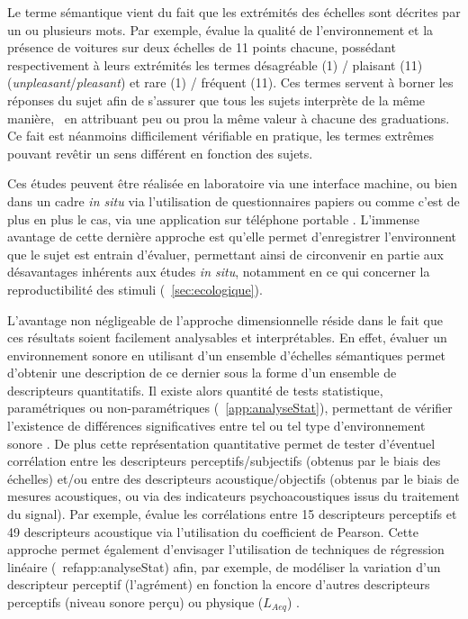 Le terme sémantique vient du fait que les extrémités des échelles sont décrites par un ou plusieurs mots. Par exemple, \citep{ricciardi2015sound} évalue la qualité de l'environnement et la présence de voitures sur deux échelles de 11 points chacune, possédant respectivement à leurs extrémités les termes désagréable (1) / plaisant (11) (\emph{unpleasant}/\emph{pleasant}) et rare (1) / fréquent (11). Ces termes servent à borner les réponses du sujet afin de s'assurer que tous les sujets interprète de la même manière, \ie~en attribuant  peu ou prou la même valeur à chacune des graduations. Ce fait est néanmoins difficilement vérifiable en pratique, les termes extrêmes pouvant revêtir un sens différent en fonction des sujets.

Ces études peuvent être réalisée en laboratoire via une interface machine, ou bien dans un cadre \emph{in situ} via l'utilisation de questionnaires papiers \citep{jeon2013soundwalk,torija2013application} ou comme c'est de plus en plus le cas, via une application sur téléphone portable \citep{kardous2014evaluation,ricciardi2015sound}. L'immense avantage de cette dernière approche est qu'elle permet d'enregistrer l'environnent que le sujet est entrain d'évaluer, permettant ainsi de circonvenir en partie aux désavantages inhérents aux études \emph{in situ}, notamment en ce qui concerner la reproductibilité des stimuli (\Cf~\ref{sec:ecologique}).

L'avantage non négligeable de l'approche dimensionnelle réside dans le fait que ces résultats soient facilement analysables et interprétables. En effet, évaluer un environnement sonore  en utilisant d'un ensemble d'échelles sémantiques permet d'obtenir une description de ce dernier sous la forme d'un ensemble de descripteurs quantitatifs. Il existe alors quantité de tests statistique, paramétriques ou non-paramétriques (\Cf~\ref{app:analyseStat}), permettant de vérifier l'existence de différences significatives entre tel ou tel type d'environnement sonore \citep{hong2013designing}. De plus cette représentation quantitative permet de tester d'éventuel corrélation entre les descripteurs perceptifs/subjectifs (obtenus par le biais des échelles) et/ou entre des descripteurs acoustique/objectifs (obtenus par le biais de mesures acoustiques, ou via des indicateurs psychoacoustiques issus du traitement du signal). Par exemple, \citep{torija2013application} évalue les corrélations entre 15 descripteurs perceptifs et 49 descripteurs acoustique via l'utilisation du coefficient de Pearson. Cette approche permet également d'envisager l'utilisation de techniques de régression linéaire (\Cf~ref{app:analyseStat}) afin, par exemple, de modéliser la variation d'un descripteur perceptif (l'agrément) en fonction la encore d'autres descripteurs perceptifs (niveau sonore perçu) ou physique ($L_{Aeq}$) \citep{lavandier2006contribution,ricciardi2015sound}.

